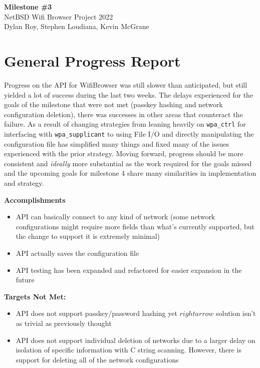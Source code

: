\documentclass[11pt]{article}
\begin{document}
\begin{center}
  \textbf{\Large Milestone \#3}\\\large NetBSD Wifi Browser Project 2022\\
  Dylan Roy, Stephen Loudiana, Kevin McGrane
\end{center}


\section{General Progress Report}
Progress on the API for WifiBrowser was still slower than anticipated, but still yielded a lot of success
during the last two weeks. The delays experienced for the goals of the milestone that were not met
(passkey hashing and network configuration deletion), there was successes in other areas that counteract
the failure. As a result of changing strategies from leaning heavily on \texttt{wpa\_ctrl} for interfacing
with \texttt{wpa\_supplicant} to using File I/O and directly manipulating the configuration file has
simplified many things and fixed many of the issues experienced with the prior strategy. Moving forward,
progress should be more consistent and \textit{ideally} more substantial as the work required for the goals
missed and the upcoming goals for milestone 4 share many similarities in implementation and strategy.

\textbf{Accomplishments}
\begin{itemize}
  \item API can basically connect to any kind of network (some network configurations might require more
    fields than what's currently supported, but the change to support it is extremely minimal)
  \item API actually saves the configuration file
  \item API testing has been expanded and refactored for easier expansion in the future
\end{itemize}

\textbf{Targets Not Met:}
\begin{itemize}
  \item API does not support passkey/password hashing yet $rightarrow$ solution isn't as trivial as previously
    thought
  \item API does not support individual deletion of networks due to a larger delay on isolation of specific information
    with C string scanning. However, there is support for deleting all of the network configurations
\end{itemize}
\end{document}
